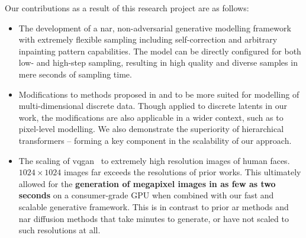 Our contributions as a result of this research project are as follows:
\begin{itemize}
    \item
        The development of a \acrlong{nar}, non-adversarial generative modelling
        framework with extremely flexible sampling including self-correction and
        arbitrary inpainting pattern capabilities. The model can be directly
        configured for both low- and high-step sampling, resulting in high
        quality and diverse samples in mere seconds of sampling time.

    \item
        Modifications to methods proposed in \citet{savinov2022stepunrolled} and
        \citet{nawrot2021hierarchical} to be more suited for modelling of
        multi-dimensional discrete data. Though applied to discrete latents in
        our work, the modifications are also applicable in a wider context,
        such as to pixel-level modelling. We also demonstrate the superiority of
        hierarchical transformers -- forming a key component in the scalability
        of our approach. 

    \item
        The scaling of \gls{vqgan}~\cite{esser2021taming} to extremely high
        resolution images of human faces. $1024 \times 1024$ images far exceeds
        the resolutions of prior works. This ultimately allowed for the
        \textbf{generation of megapixel images in as few as two seconds} on a
        consumer-grade GPU when combined with our fast and scalable generative
        framework. This is in contrast to prior \gls{ar} methods and \gls{nar}
        diffusion methods that take minutes to generate, or have not scaled to
        such resolutions at all.

\end{itemize}
